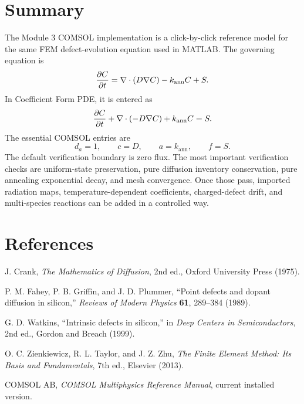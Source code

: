 \documentclass[11pt]{article}
\begin{document}
\section{Summary}

The Module 3 COMSOL implementation is a click-by-click reference model for the same FEM defect-evolution equation used in MATLAB. The governing equation is
\begin{equation}
\pdv{C}{t}=\nabla\cdot(D\nabla C)-k_{\mathrm{ann}}C+S.
\end{equation}
In Coefficient Form PDE, it is entered as
\begin{equation}
\pdv{C}{t}+\nabla\cdot(-D\nabla C)+k_{\mathrm{ann}}C=S.
\end{equation}
The essential COMSOL entries are
\begin{equation}
\boxed{d_a=1,\qquad c=D,\qquad a=k_{\mathrm{ann}},\qquad f=S.}
\end{equation}
The default verification boundary is zero flux. The most important verification checks are uniform-state preservation, pure diffusion inventory conservation, pure annealing exponential decay, and mesh convergence. Once those pass, imported radiation maps, temperature-dependent coefficients, charged-defect drift, and multi-species reactions can be added in a controlled way.

\section{References}
\begin{sloppypar}
\begin{enumerate}[label={[
\arabic*]}]
\item J. Crank, \emph{The Mathematics of Diffusion}, 2nd ed., Oxford University Press (1975).
\item P. M. Fahey, P. B. Griffin, and J. D. Plummer, ``Point defects and dopant diffusion in silicon,'' \emph{Reviews of Modern Physics} \textbf{61}, 289--384 (1989).
\item G. D. Watkins, ``Intrinsic defects in silicon,'' in \emph{Deep Centers in Semiconductors}, 2nd ed., Gordon and Breach (1999).
\item O. C. Zienkiewicz, R. L. Taylor, and J. Z. Zhu, \emph{The Finite Element Method: Its Basis and Fundamentals}, 7th ed., Elsevier (2013).
\item COMSOL AB, \emph{COMSOL Multiphysics Reference Manual}, current installed version.
\end{enumerate}
\end{sloppypar}
\end{document}
